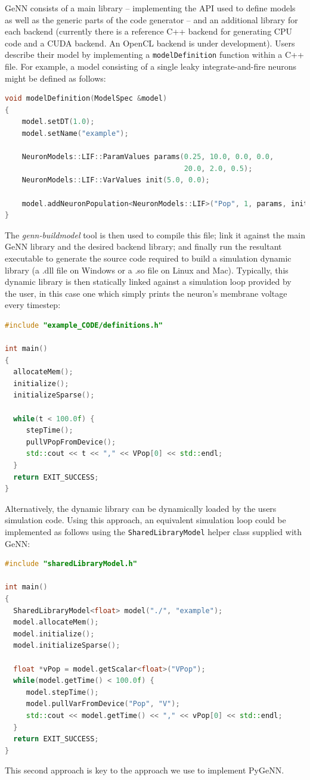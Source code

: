 \documentclass[utf8]{frontiersSCNS} %
\begin{document}
GeNN consists of a main library -- implementing the API used to define models as well as the generic parts of the code generator -- and an additional library for each backend (currently there is a reference C++ backend for generating CPU code and a CUDA backend. An OpenCL backend is under development).
Users describe their model by implementing a \lstinline{modelDefinition} function within a C++ file. For example, a model consisting of a single leaky integrate-and-fire neurons might be defined as follows:
%
\begin{lstlisting}[language=C++]
void modelDefinition(ModelSpec &model)
{
    model.setDT(1.0);
    model.setName("example");
    
    NeuronModels::LIF::ParamValues params(0.25, 10.0, 0.0, 0.0, 
                                          20.0, 2.0, 0.5);
    NeuronModels::LIF::VarValues init(5.0, 0.0);
    
    model.addNeuronPopulation<NeuronModels::LIF>("Pop", 1, params, init);
}
\end{lstlisting}
%
The \emph{genn-buildmodel} tool is then used to compile this file; link it against the main GeNN library and the desired backend library; and finally run the resultant executable to generate the source code required to build a simulation dynamic library (a .dll file on Windows or a .so file on Linux and Mac).
Typically, this dynamic library is then statically linked against a simulation loop provided by the user, in this case one which simply prints the neuron's membrane voltage every timestep:
%
\begin{lstlisting}[language=C++]
#include "example_CODE/definitions.h"

int main()
{
  allocateMem();
  initialize();
  initializeSparse();

  while(t < 100.0f) {
     stepTime();
     pullVPopFromDevice();
     std::cout << t << "," << VPop[0] << std::endl;
  }
  return EXIT_SUCCESS;
}
\end{lstlisting}
%
Alternatively, the dynamic library can be dynamically loaded by the users simulation code.
Using this approach, an equivalent simulation loop could be implemented as follows using the \lstinline{SharedLibraryModel} helper class supplied with GeNN:
%
\begin{lstlisting}[language=C++]
#include "sharedLibraryModel.h"

int main()
{
  SharedLibraryModel<float> model("./", "example");
  model.allocateMem();
  model.initialize();
  model.initializeSparse();

  float *vPop = model.getScalar<float>("VPop");
  while(model.getTime() < 100.0f) {
     model.stepTime();
     model.pullVarFromDevice("Pop", "V");
     std::cout << model.getTime() << "," << vPop[0] << std::endl;
  }
  return EXIT_SUCCESS;
}
\end{lstlisting}
%
This second approach is key to the approach we use to implement PyGeNN.
\end{document}
